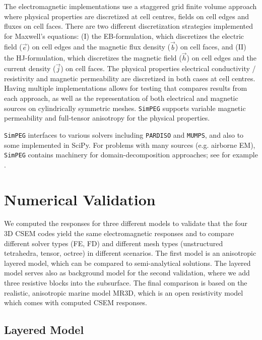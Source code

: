 \documentclass[
    paper,
  ]{geophysics}
\newcommand{\simpeg}{\texttt{SimPEG}\xspace}
\begin{document}
The electromagnetic implementations use a staggered grid finite volume approach where physical properties are discretized at cell centres, fields on cell edges and fluxes on cell faces.
There are two different discretization strategies implemented for Maxwell's equations: (I) the EB-formulation, which discretizes the electric field ($\vec{e}$) on cell edges and the magnetic flux density ($\vec{b}$) on cell faces, and (II) the HJ-formulation, which discretizes the magnetic field ($\vec{h}$) on cell edges and the current density ($\vec{j}$) on cell faces. The physical properties electrical conductivity / resistivity and magnetic permeability are discretized in both cases at cell centres. Having multiple implementations allows for testing that compares results from each approach, as well as the representation of both electrical and magnetic sources on cylindrically symmetric meshes. \simpeg supports variable magnetic permeability and full-tensor anisotropy for the physical properties.

\simpeg interfaces to various solvers including \texttt{PARDISO} and \texttt{MUMPS}, and also to some implemented in SciPy. For problems with many sources (e.g. airborne EM), \simpeg contains machinery for domain-decomposition approaches; see for example \cite{GEO.20.Fournier}.

\section{Numerical Validation}

We computed the responses for three different models to validate that the four 3D CSEM codes yield the same electromagnetic responses and to compare different solver types (FE, FD) and different mesh types (unstructured tetrahedra, tensor, octree) in different scenarios. The first model is an anisotropic layered model, which can be compared to semi-analytical solutions. The layered model serves also as background model for the second validation, where we add three resistive blocks into the subsurface. The final comparison is based on the realistic, anisotropic marine model MR3D, which is an open resistivity model which comes with computed CSEM responses.

\subsection{Layered Model}
\end{document}
